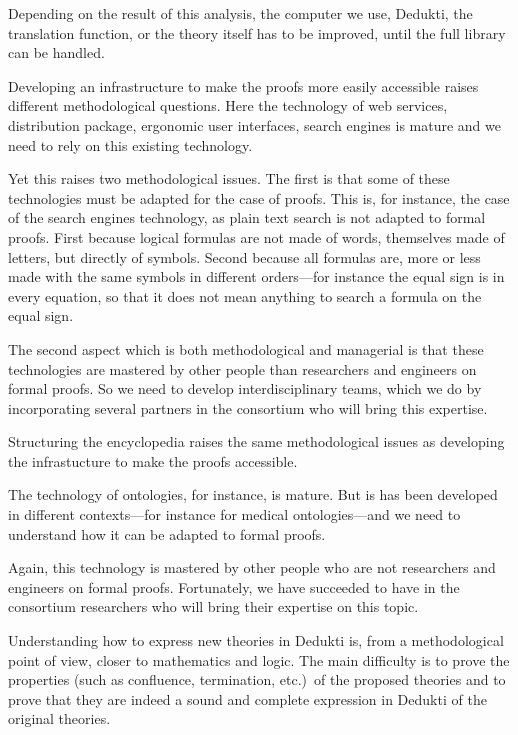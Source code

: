 Depending on the result of this analysis, the computer we use, Dedukti,
the translation function, or the theory itself has to be improved, until
the full library can be handled.


Developing an infrastructure to make the proofs more easily accessible
raises different methodological questions. Here the technology of web
services, distribution package, ergonomic user interfaces, search
engines is mature and we need to rely on this existing technology.

Yet this raises two methodological issues. The first is that some of
these technologies must be adapted for the case of proofs. This is,
for instance, the case of the search engines technology, as plain text
search is not adapted to formal proofs. First because logical formulas
are not made of words, themselves made of letters, but directly of
symbols. Second because all formulas are, more or less made with the
same symbols in different orders---for instance the equal sign is in
every equation, so that it does not mean anything to search a formula
on the equal sign.

The second aspect which is both methodological and managerial is that
these technologies are mastered by other people than researchers and
engineers on formal proofs. So we need to develop interdisciplinary
teams, which we do by incorporating several partners in the consortium
who will bring this expertise.


Structuring the encyclopedia raises the same methodological issues
as developing the infrastucture to make the proofs accessible.

The technology of ontologies, for instance, is mature. But is has been
developed in different contexts---for instance for medical
ontologies---and we need to understand how it can be adapted to formal
proofs.

Again, this technology is mastered by other people who are not
researchers and engineers on formal proofs. Fortunately, we have
succeeded to have in the consortium researchers who will bring their
expertise on this topic.


Understanding how to express new theories in Dedukti is, from a
methodological point of view, closer to mathematics and logic.  The
main difficulty is to prove the properties (such as confluence,
termination, etc.)~of the proposed theories and to prove that they are
indeed a sound and complete expression in Dedukti of the original
theories.

